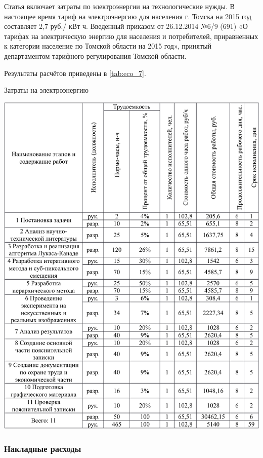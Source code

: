 Статья включает затраты по электроэнергии на технологические нужды. В настоящее время тариф на электроэнергию для населения г. Томска на 2015 год составляет 2,7 руб./ кВт ч. Введенный приказом от 26.12.2014 {\textquotedbl} №6/9 (691) «О тарифах на электрическую энергию для населения и потребителей, приравненных к категории население по Томской области на 2015 год», принятый департаментом тарифного регулирования Томской области.

Результаты расчётов приведены в \ref{tab:eco_7}.

\begin{table}[!ht]
\caption{Затраты на электроэнергию}
\centering
\includegraphics[page=7, width=1\linewidth]{econom_table.pdf}
\label{tab:eco_7}
\end{table}

\subsubsection{Накладные расходы}

